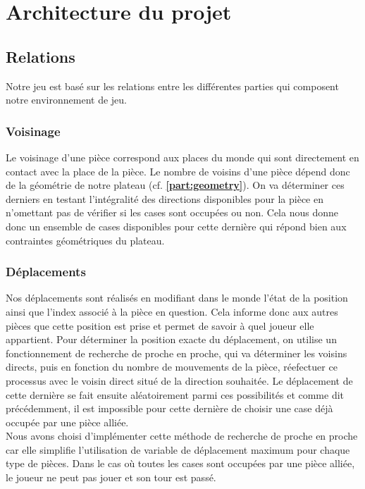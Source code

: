 \chapter{Architecture du projet}
\section{Relations}
    Notre jeu est basé sur les relations entre les différentes parties qui composent notre environnement de jeu.   
    \subsection{Voisinage}
        Le voisinage d'une pièce correspond aux places du monde qui sont directement en contact avec la place de la pièce. Le nombre de voisins d'une pièce dépend donc de la géométrie de notre plateau (cf. \textbf{\ref{part:geometry}}). On va déterminer ces derniers en testant l'intégralité des directions disponibles pour la pièce en n'omettant pas de vérifier si les cases sont occupées ou non. Cela nous donne donc un ensemble de cases disponibles pour cette dernière qui répond bien aux contraintes géométriques du plateau.
        
    \subsection{Déplacements}
        Nos déplacements sont réalisés en modifiant dans le monde l'état de la position ainsi que l'index associé à la pièce en question. Cela informe donc aux autres pièces que cette position est prise et permet de savoir à quel joueur elle appartient.
        \medbreak
        Pour déterminer la position exacte du déplacement, on utilise un fonctionnement de recherche de proche en proche, qui va déterminer les voisins directs, puis en fonction du nombre de mouvements de la pièce, réefectuer ce processus avec le voisin direct situé de la direction souhaitée. Le déplacement de cette dernière se fait ensuite aléatoirement parmi ces possibilités et comme dit précédemment, il est impossible pour cette dernière de choisir une case déjà occupée par une pièce alliée. \\
        Nous avons choisi d'implémenter cette méthode de recherche de proche en proche car elle simplifie l'utilisation de variable de déplacement maximum pour chaque type de pièces.
        \medbreak
        \noindent Dans le cas où toutes les cases sont occupées par une pièce alliée, le joueur ne peut pas jouer et son tour est passé.
        
